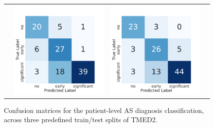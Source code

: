 \begin{figure}[H]
\begin{tabular}{r c c c }
    &
    \includegraphics[width=\BW\textwidth]{figures/confusion_matrix/cropped_seed1/VRABMIL_WholeMILPretrain.pdf}
    &
    \includegraphics[width=\BW\textwidth]{figures/confusion_matrix/cropped_seed2/VRABMIL_WholeMILPretrain.pdf}
    \end{tabular}
    \vspace{-.5cm} %
    \caption{Confusion matrices for the patient-level AS diagnosis classification, across three predefined train/test splits of TMED2.
     }
    \label{fig:confusion_matrix}
\end{figure}
